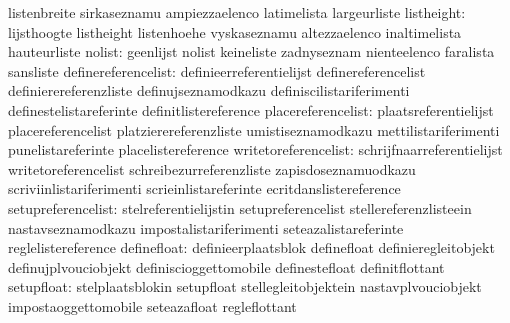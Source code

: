                                   listenbreite                     sirkaseznamu
                                  ampiezzaelenco                   latimelista
                                  largeurliste
                      listheight: lijsthoogte                      listheight
                                  listenhoehe                      vyskaseznamu
                                  altezzaelenco                    inaltimelista
                                  hauteurliste
                          nolist: geenlijst                        nolist
                                  keineliste                       zadnyseznam
                                  nienteelenco                     faralista
                                  sansliste
             definereferencelist: definieerreferentielijst         definereferencelist
                                  definierereferenzliste           definujseznamodkazu
                                  definiscilistariferimenti        definestelistareferinte
                                  definitlistereference
              placereferencelist: plaatsreferentielijst            placereferencelist
                                  platzierereferenzliste           umistiseznamodkazu
                                  mettilistariferimenti            punelistareferinte
                                  placelistereference
            writetoreferencelist: schrijfnaarreferentielijst       writetoreferencelist
                                  schreibezurreferenzliste         zapisdoseznamuodkazu
                                  scriviinlistariferimenti         scrieinlistareferinte
                                  ecritdanslistereference
              setupreferencelist: stelreferentielijstin            setupreferencelist
                                  stellereferenzlisteein           nastavseznamodkazu
                                  impostalistariferimenti          seteazalistareferinte
                                  reglelistereference
                     definefloat: definieerplaatsblok              definefloat
                                  definieregleitobjekt             definujplvouciobjekt
                                  definiscioggettomobile           definestefloat
                                  definitflottant
                      setupfloat: stelplaatsblokin                 setupfloat
                                  stellegleitobjektein             nastavplvouciobjekt
                                  impostaoggettomobile             seteazafloat
                                  regleflottant
